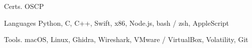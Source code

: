 
\begin{cvskills}
	\cvskill
	{Certs\hphantom{25}\color{white}.\hphantom{25}} %
	{OSCP} %

	\cvskill
	{Languages} %
	{Python, C, C++, Swift, x86, Node.js, bash / zsh, AppleScript} %

	\cvskill
	{Tools\hphantom{25}\color{white}.\hphantom{25}} %
	{macOS, Linux, Ghidra, Wireshark, VMware / VirtualBox, Volatility, Git} %

\end{cvskills}
